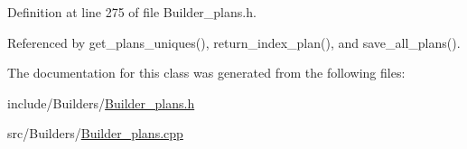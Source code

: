 Definition at line 275 of file Builder\_\-plans.h.

Referenced by get\_\-plans\_\-uniques(), return\_\-index\_\-plan(), and save\_\-all\_\-plans().

The documentation for this class was generated from the following files:\begin{CompactItemize}
\item 
include/Builders/\hyperlink{Builder__plans_8h}{Builder\_\-plans.h}\item 
src/Builders/\hyperlink{Builder__plans_8cpp}{Builder\_\-plans.cpp}\end{CompactItemize}
